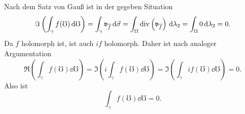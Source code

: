 \documentclass[a4paper,10pt]{article}
\begin{document}
\subsection{}
Nach dem Satz von Gauß ist in der gegeben Situation
\[
 \Im\left( \int_\gamma f(\mho) \,\text{d}\mho \right)
 = \int_\gamma \mathfrak{v}_{\overline{f}} \,\text{d}\vec{\sigma}
 = \int_\Omega \operatorname{div}\left(\mathfrak{v}_{\overline{f}}\right) \,\text{d}\lambda_2
 = \int_\Omega 0 \,\text{d}\lambda_2
 = 0.
\]
Da $f$ holomorph ist, ist auch $if$ holomorph. Daher ist nach analoger Argumentation
\[
 \Re\left( \int_\gamma f(\mho) \dd{\mho} \right)
 = \Im\left( i \int_\gamma f(\mho) \dd{\mho} \right)
 = \Im\left( \int_\gamma if(\mho) \dd{\mho} \right)
 = 0.
\]
Also ist
\[
 \int_\gamma f(\mho) \dd{\mho} = 0.
\]
\end{document}
